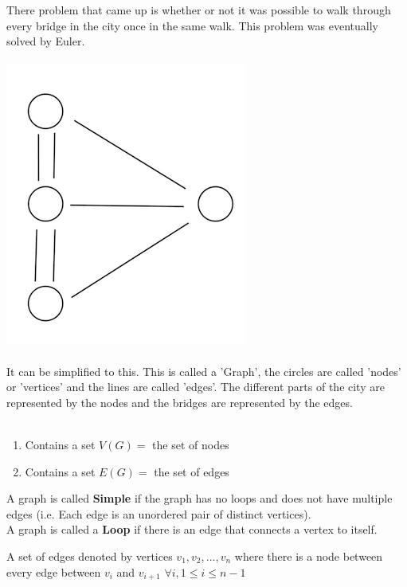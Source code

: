 \documentclass[12pt]{article}
\begin{document}
There problem that came up is whether or not it was possible to walk through every bridge in the city once in the same walk. This problem was eventually solved by Euler.\\
\\
\includegraphics{Konigsberg_bridges_graph}\\
\\
It can be simplified to this. This is called a 'Graph', the circles are called 'nodes' or 'vertices' and the lines are called 'edges'. The different parts of the city are represented by the nodes and the bridges are represented by the edges.\\
\\
\begin{tcolorbox}[title=Definition: Graph ($G$)]
	\begin{enumerate}
		\item{Contains a set $V(G) =$ the set of nodes}
		\item{Contains a set $E(G) =$ the set of edges}
	\end{enumerate}
	A graph is called \textbf{Simple} if the graph has no loops and does not have multiple edges (i.e. Each edge is an unordered pair of distinct vertices).\\
	A graph is called a \textbf{Loop} if there is an edge that connects a vertex to itself.
\end{tcolorbox}

\begin{tcolorbox}[title=Definition: Path]
	A set of edges denoted by vertices $v_1, v_2, ..., v_n$ where there is a node between every edge between $v_i$ and $v_{i+1}$ $\forall i, 1 \leq i \leq n-1$
\end{tcolorbox}
\end{document}
